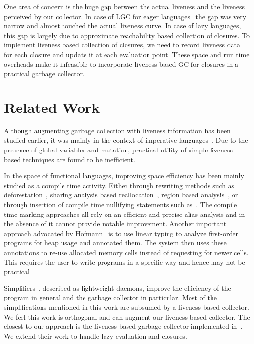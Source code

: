 \documentclass[9pt]{sigplanconf}
\begin{document}
One area  of concern is the  huge gap between the  actual liveness and
the liveness  perceived by our  collector.  In  case of LGC  for eager
languages~\cite{asati14lgc} the gap was  very narrow and almost touched
the actual  liveness curve.  In  case of  lazy languages, this  gap is
largely   due  to   approximate  reachability   based  collection   of
closures. To implement liveness based  collection of closures, we need
to  record liveness  data  for  each closure  and  update  it at  each
evaluation  point.   These  space  and  run  time  overheads  make  it
infeasible  to  incorporate  liveness  based  GC  for  closures  in  a
practical garbage collector.


\section{Related Work} 
\label{sec:relatedwork}
Although augmenting  garbage collection with liveness  information has
been  studied earlier,  it was  mainly  in the  context of  imperative
languages~\cite{Albert, Hirzel,  khedker07heap}.  Due to  the presence
of global variables and mutation, practical utility of simple liveness
based techniques are found to be inefficient.

In the space  of functional languages, improving  space efficiency has
been  mainly  studied as  a  compile  time activity.   Either  through
rewriting                methods                such                as
deforestation~\cite{wadler88deforest,gill93ashort,chitil99deforest},
sharing  analysis   based  reallocation~\cite{jones89compile},  region
based analysis~\cite{tofte98region},  or through insertion  of compile
time              nullifying              statements              such
as~\cite{inoue88analysis,lee05static,Hamilton}.    The  compile   time
marking approaches all rely on an efficient and precise alias analysis
and in the  absence of it cannot provide  notable improvement. Another
important approach  advocated by  Hofmann~\cite{HofmannJ03} is  to use
linear  typing to  analyze  first-order programs  for  heap usage  and
annotated  them. The  system  then uses  these  annotations to  re-use
allocated memory  cells instead  of requesting  for newer  cells. This
requires the  user to write programs  in a specific way  and hence may
not be practical

Simplifiers~\cite{ONeill}, described as lightweight daemons, 
improve the efficiency of the program in general and the garbage
collector in particular. Most of the simplifications mentioned in this
work are subsumed by a liveness  based collector. We feel this work is
orthogonal and can augment our  liveness based collector.  The closest
to our  approach is the  liveness based garbage  collector implemented
in~\cite{asati14lgc}. We  extend their work to  handle lazy evaluation
and closures.
 
\end{document}
